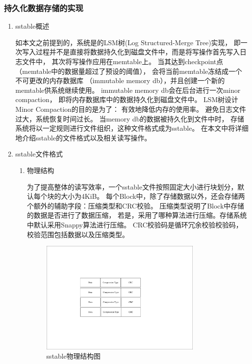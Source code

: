 		\subsubsection{持久化数据存储的实现}

			\begin{enumerate}
				\item sstable概述
				
				如本文之前提到的，系统是的LSM树(Log Structured-Merge Tree)实现，
				即一次写入过程并不是直接将数据持久化到磁盘文件中，而是将写操作首先写入日志文件中，
				其次将写操作应用在memtable上。
				当其达到checkpoint点（memtable中的数据量超过了预设的阈值），
				会将当前memtable冻结成一个不可更改的内存数据库
				（immutable memory db），并且创建一个新的memtable供系统继续使用。
				immutable memory db会在后台进行一次minor compaction，
				即将内存数据库中的数据持久化到磁盘文件中。
				LSM树设计Minor Compaction的目的是为了：
				有效地降低内存的使用率。
				避免日志文件过大，系统恢复时间过长。
				当memory db的数据被持久化到文件中时，
				存储系统将以一定规则进行文件组织，这种文件格式成为sstable。
				在本文中将详细地介绍sstable的文件格式以及相关读写操作。

				\item sstable文件格式
				

				\begin{enumerate}
					\item 物理结构

					为了提高整体的读写效率，一个sstable文件按照固定大小进行块划分，默认每个块的大小为4KiB。
					每个Block中，除了存储数据以外，还会存储两个额外的辅助字段：压缩类型和CRC校验。
					压缩类型说明了Block中存储的数据是否进行了数据压缩，
					若是，采用了哪种算法进行压缩。存储系统中默认采用Snappy算法进行压缩。
					CRC校验码是循环冗余校验校验码，校验范围包括数据以及压缩类型。
					
					\begin{figure}[H]
						\centering
						\includegraphics[width=0.80\textwidth]{pdf/sstable_physic.pdf}
						\caption{sstable物理结构图}
						\label{sstable_physic}
					\end{figure}
					

\end{enumerate}
\end{enumerate}
